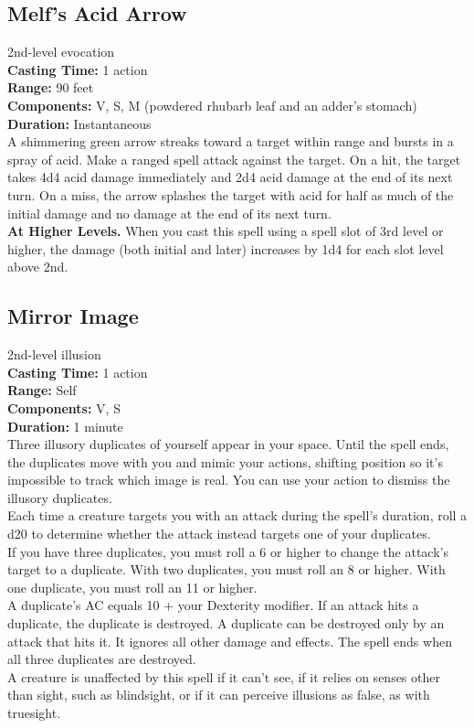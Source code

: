 \documentclass[11pt, A4paper, english]{article}
\begin{document}
		\subsection{Melf's Acid Arrow}
2nd-level evocation \\
\textbf{Casting Time:} 1 action \\
\textbf{Range:} 90 feet \\
\textbf{Components:} V, S, M (powdered rhubarb leaf and an adder's stomach) \\
\textbf{Duration:} Instantaneous \\
A shimmering green arrow streaks toward a target within range and bursts in a spray of acid. Make a ranged spell attack against the target. On a hit, the target takes 4d4 acid damage immediately and 2d4 acid damage at the end of its next turn. On a miss, the arrow splashes the target with acid for half as much of the initial damage and no damage at the end of its next turn. \\
\textbf{At Higher Levels.} When you cast this spell using a spell slot of 3rd level or higher, the damage (both initial and later) increases by 1d4 for each slot level above 2nd.

		\subsection{Mirror Image}
2nd-level illusion \\
\textbf{Casting Time:} 1 action \\
\textbf{Range:} Self \\
\textbf{Components:} V, S \\
\textbf{Duration:} 1 minute \\
Three illusory duplicates of yourself appear in your space. Until the spell ends, the duplicates move with you and mimic your actions, shifting position so it's impossible to track which image is real. You can use your action to dismiss the illusory duplicates. \\
Each time a creature targets you with an attack during the spell's duration, roll a d20 to determine whether the attack instead targets one of your duplicates. \\
If you have three duplicates, you must roll a 6 or higher to change the attack's target to a duplicate. With two duplicates, you must roll an 8 or higher. With one duplicate, you must roll an 11 or higher. \\
A duplicate's AC equals 10 + your Dexterity modifier. If an attack hits a duplicate, the duplicate is destroyed. A duplicate can be destroyed only by an attack that hits it. It ignores all other damage and effects. The spell ends when all three duplicates are destroyed. \\
A creature is unaffected by this spell if it can't see, if it relies on senses other than sight, such as blindsight, or if it can perceive illusions as false, as with truesight.
\end{document}
